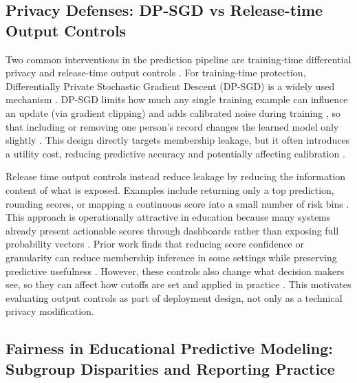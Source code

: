 \documentclass{edm_article}
\begin{document}
\subsection{Privacy Defenses: DP-SGD vs Release-time Output Controls}

Two common interventions in the prediction pipeline are training-time differential privacy and release-time output controls \cite{7he2025labelonly,8niu2024_mia_survey,9abadi2016_dpsgd}. For training-time protection, Differentially Private Stochastic Gradient Descent (DP-SGD) is a widely used mechanism \cite{9abadi2016_dpsgd,10jagielski2020_auditing_dpsgd}. DP-SGD limits how much any single training example can influence an update (via gradient clipping) and adds calibrated noise during training \cite{9abadi2016_dpsgd}, so that including or removing one person's record changes the learned model only slightly \cite{11sander2023tan}. This design directly targets membership leakage, but it often introduces a utility cost, reducing predictive accuracy and potentially affecting calibration \cite{12demelius2025recent-advances-dpdl}.

Release time output controls instead reduce leakage by reducing the information content of what is exposed. Examples include returning only a top prediction, rounding scores, or mapping a continuous score into a small number of risk bins \cite{1shokri2017membership,14jia2019_memguard,15hu2023_mia_defenses_survey}. This approach is operationally attractive in education because many systems already present actionable scores through dashboards rather than exposing full probability vectors \cite{3plak2022_ews_dashboard}. Prior work finds that reducing score confidence or granularity can reduce membership inference in some settings while preserving predictive usefulness \cite{1shokri2017membership,14jia2019_memguard,15hu2023_mia_defenses_survey,16chen2024hamp}. However, these controls also change what decision makers see, so they can affect how cutoffs are set and applied in practice \cite{3plak2022_ews_dashboard,17susnjak2022_la_dashboard_actionable}. This motivates evaluating output controls as part of deployment design, not only as a technical privacy modification.

\subsection{Fairness in Educational Predictive Modeling: Subgroup Disparities and Reporting Practice}
\end{document}
